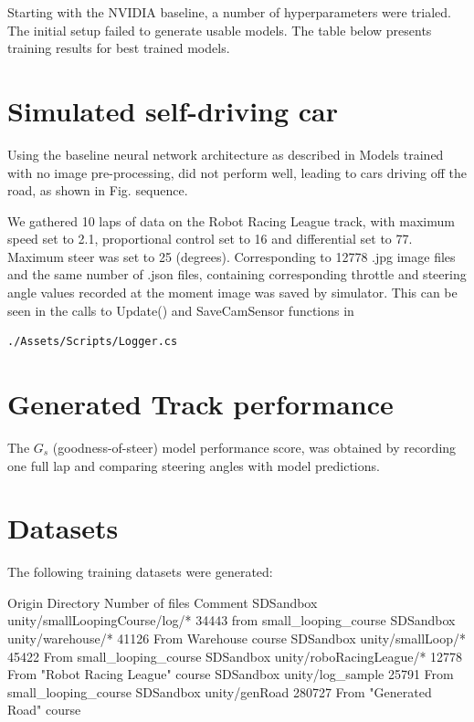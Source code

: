 Starting with the NVIDIA baseline, a number of hyperparameters were trialed. The initial setup failed to generate usable models. 
The table below presents training results for best trained models.


\section{Simulated self-driving car}

Using the baseline neural network architecture as described in 
Models trained with no image pre-processing, did not perform well, leading to cars driving off the road, as shown in Fig.  sequence.

We gathered 10 laps of data on the Robot Racing League track, with maximum speed set to 2.1, proportional control set to 16 and differential set to 77. Maximum steer was set to 25 (degrees). Corresponding to 12778 .jpg image files and the same number of  .json files, containing corresponding throttle and steering angle values recorded at the moment image was saved by simulator. This can be seen in the calls to Update() and SaveCamSensor functions in  
\begin{verbatim}
./Assets/Scripts/Logger.cs
\end{verbatim}

\section{Generated Track performance}


The $G_s$ (goodness-of-steer) model performance score, was obtained by recording one full lap and comparing steering angles with model predictions.

\section{Datasets}

The following training datasets were generated:

Origin  Directory   Number of files Comment
SDSandbox   unity/smallLoopingCourse/log/* 34443 from small\_looping\_course
SDSandbox   unity/warehouse/*   41126 From Warehouse course
SDSandbox   unity/smallLoop/*   45422   From small\_looping\_course
SDSandbox   unity/roboRacingLeague/* 12778 From "Robot Racing League" course
SDSandbox   unity/log\_sample   25791   From small\_looping\_course
SDSandbox   unity/genRoad 280727 From "Generated Road" course



